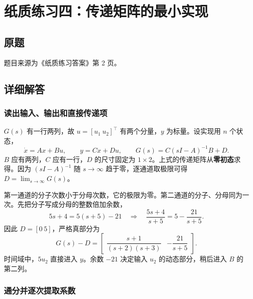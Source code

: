 \chapter{纸质练习四：传递矩阵的最小实现}
\label{paperwork:04}

\section{原题}


题目来源为《纸质练习答案》第 2 页。


\section{详细解答}

\subsection{读出输入、输出和直接传递项}

$G(s)$ 有一行两列，故 $u=[u_1\ u_2]^\top$ 有两个分量，$y$ 为标量。设实现用 $n$ 个状态，
\[
    \dot x=Ax+Bu,\qquad y=Cx+Du,\qquad
    G(s)=C(sI-A)^{-1}B+D .
\]
$B$ 应有两列，$C$ 应有一行，$D$ 的尺寸固定为 $1\times2$。上式的传递矩阵从\textbf{零初态}求得。因为 $(sI-A)^{-1}$ 随 $s\to\infty$ 趋于零，逐通道取极限可得 $D=\lim_{s\to\infty}G(s)$。

第一通道的分子次数小于分母次数，它的极限为零。第二通道的分子、分母同为一次。先把分子写成分母的整数倍加余数，
\[
    5s+4=5(s+5)-21
    \quad\Longrightarrow\quad
    \frac{5s+4}{s+5}=5-\frac{21}{s+5}.
\]
因此 $D=[0\ 5]$，严格真部分为
\[
    G(s)-D=
    \begin{bmatrix}\dfrac{s+1}{(s+2)(s+3)} &-\dfrac{21}{s+5}\end{bmatrix}.
\]
时间域中，$5u_2$ 直接进入 $y$。余数 $-21$ 决定输入 $u_2$ 的动态部分，稍后进入 $B$ 的第二列。

\subsection{通分并逐次提取系数}

